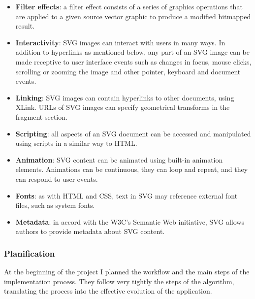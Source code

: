 \documentclass[]{usiinfbachelorproject}
\begin{document}
\begin{itemize}
	\item {\bf Filter effects}: a filter effect consists of a series of graphics operations that are applied to a given source vector graphic to produce a modified bitmapped result.
	\item {\bf Interactivity}: SVG images can interact with users in many ways. In addition to hyperlinks as mentioned below, any part of an SVG image can be made receptive to user interface events such as changes in focus, mouse clicks, scrolling or zooming the image and other pointer, keyboard and document events.
	\item {\bf Linking}: SVG images can contain hyperlinks to other documents, using XLink. URLs of SVG images can specify geometrical transforms in the fragment section.
	\item {\bf Scripting}: all aspects of an SVG document can be accessed and manipulated using scripts in a similar way to HTML. 
	\item {\bf Animation}: SVG content can be animated using built-in animation elements. Animations can be continuous, they can loop and repeat, and they can respond to user events.
	\item {\bf Fonts}: as with HTML and CSS, text in SVG may reference external font files, such as system fonts.
	\item {\bf Metadata}: in accord with the W3C's Semantic Web initiative, SVG allows authors to provide metadata about SVG content.
\end{itemize}

\subsubsection{Planification}

At the beginning of the project I planned the workflow and the main steps of the implementation process. They follow very tightly the steps of the algorithm, translating the process into the effective evolution of the application.\\
\end{document}
